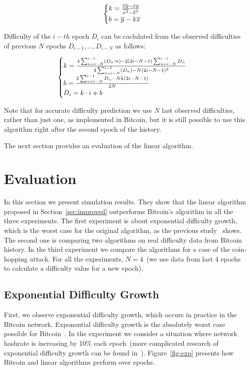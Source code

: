 \documentclass[]{llncs}
\newcommand*\mean[1]{\bar{#1}}
\newcommand*\widemean[1]{\overline{#1}}
\begin{document}
$$
  \begin{cases}
    k= {{\widemean{xy} - \mean{x} \mean{y}} \over {\widemean{x^2} - \widemean{x}^2}}  \\
    b= \widemean{y}-k\widemean{x}
  \end{cases}
$$

Difficulty of the $i-th$ epoch $D_i$ can be caclulated from the observed difficulties of previous $N$ epochs $D_{i-1},...,D_{i-N}$ as follows:

$$
  \begin{cases}
    k= {4\sum_{n=i-N}^{i-1} (D_n \cdot n) - 2 (2i-N-1) \sum_{n=i-N}^{i-1} D_n \over 4\sum_{n=i-N}^{i-1} (D_n) - N (2i-N-1)^2} \\
    b= {2\sum_{n=i-N}^{i-1} D_n - N k (2i-N-1) \over 2N} \\
    D_i= k \cdot i + b
  \end{cases}
$$

Note that for accurate difficulty prediction we use $N$ last observed difficulties, rather than just one, as implemented in Bitcoin, but it is still possible to use this algorithm right after the second epoch of the history.

The next section provides an evaluation of the linear algorithm.

\section{Evaluation}
\label{sec:sim}

In this section we present simulation results. They show that the linear algorithm proposed in Section~\ref{sec:improved} outperforms Bitcoin's algorithm in all the three experiments. The first experiment is about exponential difficulty growth, which is the worst case for the original algorithm, as the previous study~\cite{kraft2015difficulty} shows. The second one is comparing two algorithms on real difficulty data from Bitcoin history. In the third experiment we compare the algorithms for a case of the coin-hopping attack. For all the experiments, $N=4$~(we use data from last 4 epochs to calculate a difficulty value for a new epoch).  

\subsection{Exponential Difficulty Growth}
\label{sec:experiment}
First, we observe exponential difficulty growth, which occurs in practice in the Bitcoin network. Exponential difficulty growth is the absolutely worst case possible for Bitcoin~\cite{kraft2015difficulty}.
In the experiment we consider a situation where network hashrate is increasing by 10\% each epoch~(more complicated research of exponential difficulty growth can be found in~\cite{kraft2015difficulty}).
Figure~\ref{fig:exp} presents how Bitcoin and linear algorithms perform over epochs.
\end{document}
